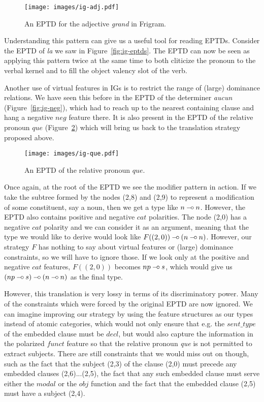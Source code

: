 \begin{figure}
  \centering
  \texttt{[image: images/ig-adj.pdf]}
  \caption{\label{fig:ig-adj} An EPTD for the adjective \emph{grand} in
    Frigram.}
\end{figure}

Understanding this pattern can give us a useful tool for reading
EPTDs. Consider the EPTD of \emph{la} we saw in
Figure~\ref{fig:ig-eptds}. The EPTD can now be seen as applying this
pattern twice at the same time to both cliticize the pronoun to the
verbal kernel and to fill the object valency slot of the verb.

Another use of virtual features in IGs is to restrict the range of
(large) dominance relations. We have seen this before in the EPTD of the
determiner \emph{aucun} (Figure~\ref{fig:ig-neg}), which had to reach up
to the nearest containing clause and hang a negative $neg$ feature
there.  It is also present in the EPTD of the relative pronoun $que$
(Figure~\ref{fig:ig-que}) which will bring us back to the translation
strategy proposed above.

\begin{figure}
  \centering
  \texttt{[image: images/ig-que.pdf]}
  \caption{\label{fig:ig-que} An EPTD of the relative pronoun $que$.}
\end{figure}

Once again, at the root of the EPTD we see the modifier pattern in
action. If we take the subtree formed by the nodes (2,8) and (2,9) to
represent a modification of some constituent, say a noun, then we get a
type like $n \mathbin{{-}\mkern-3.5mu{\circ}} n$. However, the EPTD also contains positive and
negative $cat$ polarities. The node (2,0) has a negative $cat$ polarity
and we can consider it as an argument, meaning that the type we would
like to derive would look like $F((2,0)) \mathbin{{-}\mkern-3.5mu{\circ}} (n \mathbin{{-}\mkern-3.5mu{\circ}} n)$. However,
our strategy $F$ has nothing to say about virtual features or (large)
dominance constraints, so we will have to ignore those. If we look only
at the positive and negative $cat$ features, $F((2,0))$ becomes $np
\mathbin{{-}\mkern-3.5mu{\circ}} s$, which would give us $(np \mathbin{{-}\mkern-3.5mu{\circ}} s) \mathbin{{-}\mkern-3.5mu{\circ}} (n \mathbin{{-}\mkern-3.5mu{\circ}} n)$ as the
final type.

However, this translation is very lossy in terms of its discriminatory
power. Many of the constraints which were forced by the original EPTD
are now ignored. We can imagine improving our strategy by using the
feature structures as our types instead of atomic categories, which
would not only ensure that e.g. the $sent\_type$ of the embedded clause
must be $decl$, but would also capture the information in the polarized
$funct$ feature so that the relative pronoun \emph{que} is not permitted
to extract subjects. There are still constraints that we would miss out
on though, such as the fact that the subject (2,3) of the clause (2,0)
must precede any embedded clauses (2,6)...(2,5), the fact that any such
embedded clause must serve either the $modal$ or the $obj$ function and
the fact that the embedded clause (2,5) must have a subject (2,4).

